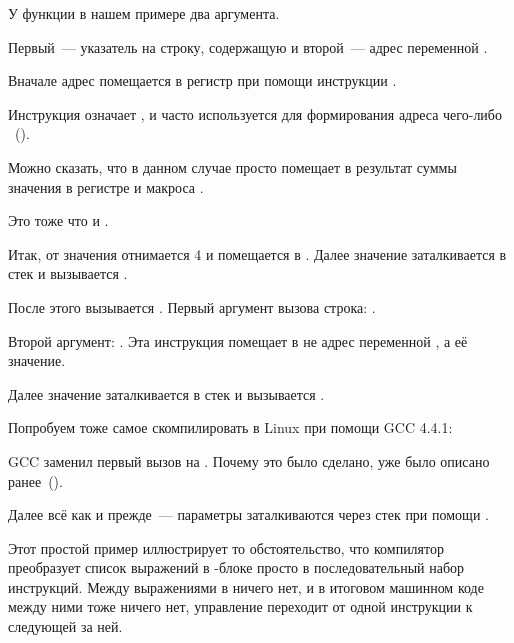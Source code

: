 У функции \scanf в нашем примере два аргумента.

Первый~--- указатель на строку, содержащую  и второй~--- адрес переменной .

Вначале адрес  помещается в регистр \EAX при помощи инструкции .

Инструкция \LEA означает , и часто используется для формирования адреса чего-либо ~().

Можно сказать, что в данном случае \LEA просто помещает в \EAX результат суммы значения в регистре \EBP и макроса .

Это тоже что и .

Итак, от значения \EBP отнимается 4 и помещается в \EAX.
Далее значение \EAX заталкивается в стек и вызывается \scanf.

После этого вызывается \printf. Первый аргумент вызова строка:
.

Второй аргумент: .
Эта инструкция помещает в \ECX не адрес переменной , а её значение.

Далее значение \ECX заталкивается в стек и вызывается \printf.




Попробуем тоже самое скомпилировать в Linux при помощи GCC 4.4.1:



GCC заменил первый вызов \printf на \puts. Почему это было сделано, 
уже было описано ранее~().

% 


Далее всё как и прежде~--- параметры заталкиваются через стек при помощи \MOV.


Этот простой пример иллюстрирует то обстоятельство, что компилятор преобразует
список выражений в \CCpp-блоке просто в последовательный набор инструкций.
Между выражениями в \CCpp ничего нет, и в итоговом машинном коде между ними тоже ничего нет, 
управление переходит от одной инструкции к следующей за ней.

